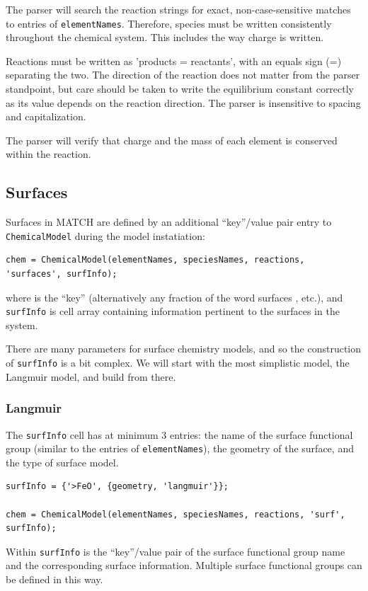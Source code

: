 \documentclass{article}
\begin{document}
The parser will search the reaction strings for exact, non-case-sensitive matches to entries of \verb|elementNames|. Therefore, species must be written consistently throughout the chemical system. This includes the way charge is written. 

Reactions must be written as 'products = reactants', with an equals sign (=) separating the two. The direction of the reaction does not matter from the parser standpoint, but care should be taken to write the equilibrium constant correctly as its value depends on the reaction direction. The parser is insensitive to spacing and capitalization. 

The parser will verify that charge and the mass of each element is conserved within the reaction.


\subsection{Surfaces}\label{sec:surfaces}
Surfaces in MATCH are defined by an additional ``key''/value pair entry to \verb|ChemicalModel| during the model instatiation:

\begin{lstlisting}
chem = ChemicalModel(elementNames, speciesNames, reactions, 'surfaces', surfInfo);
\end{lstlisting}
where  is the ``key'' (alternatively any fraction of the word surfaces ,  etc.), and \verb|surfInfo| is cell array containing information pertinent to the surfaces in the system. 

There are many parameters for surface chemistry models, and so the construction of \verb|surfInfo| is a bit complex. We will start with the most simplistic model, the Langmuir model, and build from there.

\subsubsection{Langmuir}

The \verb|surfInfo| cell has at minimum 3 entries: the name of the surface functional group (similar to the entries of \verb|elementNames|), the geometry of the surface, and the type of surface model.

\begin{lstlisting}
surfInfo = {'>FeO', {geometry, 'langmuir'}};

chem = ChemicalModel(elementNames, speciesNames, reactions, 'surf', surfInfo);
\end{lstlisting}
Within \verb|surfInfo| is the ``key''/value pair of the surface functional group name and the corresponding surface information. Multiple surface functional groups can be defined in this way. 
\end{document}

